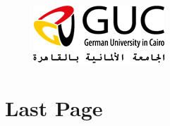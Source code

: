 \documentclass[twocolumn]{article}
\begin{document}
	\begin{figure}
		\begin{center}
			\includegraphics{guc_logo}
		\end{center}
	\end{figure}

	\tableofcontents

	\newpage

	

	\newpage

	\section{Last Page}

	
\end{document}
